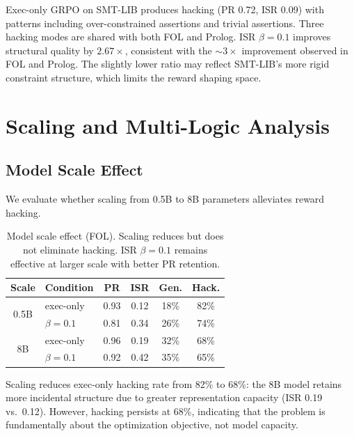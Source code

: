\documentclass[11pt,twocolumn]{article}
\newcommand{\isr}{\textsc{ISR}}
\newcommand{\pr}{\textsc{PR}}
\newcommand{\grpo}{\textsc{GRPO}}
\begin{document}
Exec-only \grpo{} on SMT-LIB produces hacking (PR 0.72, ISR 0.09) with patterns including over-constrained assertions and trivial assertions.
Three hacking modes are shared with both FOL and Prolog.
ISR $\beta{=}0.1$ improves structural quality by $2.67\times$, consistent with the ${\sim}3\times$ improvement observed in FOL and Prolog.
The slightly lower ratio may reflect SMT-LIB's more rigid constraint structure, which limits the reward shaping space.

\section{Scaling and Multi-Logic Analysis}
\label{sec:scaling}

\subsection{Model Scale Effect}
\label{sec:scale}

We evaluate whether scaling from 0.5B to 8B parameters alleviates reward hacking.

\begin{table}[h]
\centering
\caption{Model scale effect (FOL). Scaling reduces but does not eliminate hacking. ISR $\beta{=}0.1$ remains effective at larger scale with better PR retention.}
\label{tab:scale}
\small
\begin{tabular}{@{}clcccc@{}}
\toprule
Scale & Condition & \pr{} & \isr{} & Gen. & Hack. \\
\midrule
\multirow{2}{*}{0.5B} & exec-only & 0.93 & 0.12 & 18\% & 82\% \\
                       & $\beta{=}0.1$ & 0.81 & 0.34 & 26\% & 74\% \\
\midrule
\multirow{2}{*}{8B}   & exec-only & 0.96 & 0.19 & 32\% & 68\% \\
                       & $\beta{=}0.1$ & 0.92 & 0.42 & 35\% & 65\% \\
\bottomrule
\end{tabular}
\end{table}

Scaling reduces exec-only hacking rate from 82\% to 68\%: the 8B model retains more incidental structure due to greater representation capacity (\isr{} 0.19 vs.\ 0.12).
However, hacking persists at 68\%, indicating that the problem is fundamentally about the optimization objective, not model capacity.
\end{document}
